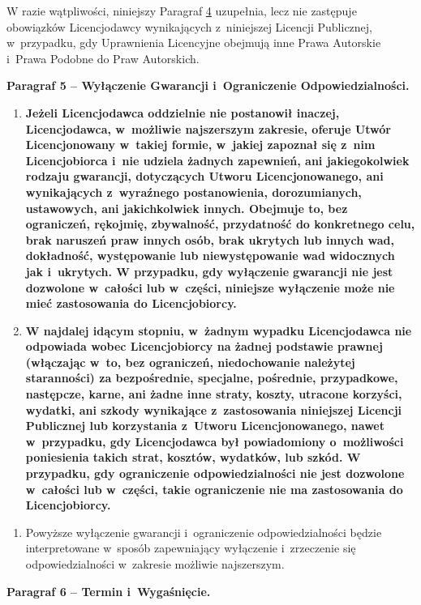 \documentclass[oneside,polish,11pt,rmheadings]{mwbk}
\begin{document}
W razie wątpliwości, niniejszy Paragraf \href{about:reader?url=https%3A%2F%2Fcreativecommons.org%2Flicenses%2Fby-nc-sa%2F4.0%2Flegalcode.pl#s4}{4} 
uzupełnia, lecz nie zastępuje obowiązków Licencjodawcy wynikających z~niniejszej Licencji Publicznej, w~przypadku, gdy Uprawnienia Licencyjne obejmują inne Prawa Autorskie i~Prawa Podobne do Praw Autorskich.  

\textbf{Paragraf 5 – Wyłączenie Gwarancji i~Ograniczenie Odpowiedzialności.} 
\begin{enumerate}
\item  \textbf{{\textmd{Jeżeli Licencjodawca oddzielnie nie postanowił inaczej, Licencjodawca, w~możliwie najszerszym zakresie, oferuje Utwór Licencjonowany w~takiej formie, w~jakiej zapoznał się z~nim Licencjobiorca i~nie udziela żadnych zapewnień, ani jakiegokolwiek rodzaju gwarancji, dotyczących Utworu Licencjonowanego, ani wynikających z~wyraźnego postanowienia, dorozumianych, ustawowych, ani jakichkolwiek innych. Obejmuje to, bez ograniczeń, rękojmię, zbywalność, przydatność do konkretnego celu, brak naruszeń praw innych osób, brak ukrytych lub innych wad, dokładność, występowanie lub niewystępowanie wad widocznych jak i~ukrytych. W przypadku, gdy wyłączenie }}}\textbf{{\textmd{gwarancji nie jest dozwolone w~całości lub w~części, niniejsze wyłączenie może nie mieć zastosowania do Licencjobiorcy.}}}{ } 
\item  \textbf{{\textmd{W najdalej idącym stopniu, w~żadnym wypadku Licencjodawca nie odpowiada wobec Licencjobiorcy na żadnej podstawie prawnej (włączając w~to, bez ograniczeń, niedochowanie należytej staranności) za bezpośrednie, specjalne, pośrednie, przypadkowe, następcze, karne, ani żadne inne straty, koszty, utracone korzyści, wydatki, ani szkody wynikające z~zastosowania niniejszej Licencji Publicznej lub korzystania z~Utworu Licencjonowanego, nawet w~przypadku, gdy Licencjodawca był powiadomiony o~możliwości poniesienia takich strat, kosztów, wydatków, lub szkód. W przypadku, gdy ograniczenie odpowiedzialności nie jest dozwolone w~całości lub w~części, takie ograniczenie nie ma zastosowania do Licencjobiorcy.}}}{ } \end{enumerate}
\begin{enumerate}
\item  Powyższe wyłączenie gwarancji i~ograniczenie odpowiedzialności będzie interpretowane w~sposób zapewniający wyłączenie i~zrzeczenie się odpowiedzialności w~zakresie możliwie najszerszym.  \end{enumerate}
\textbf{Paragraf 6 – Termin i~Wygaśnięcie.} 
\end{document}
